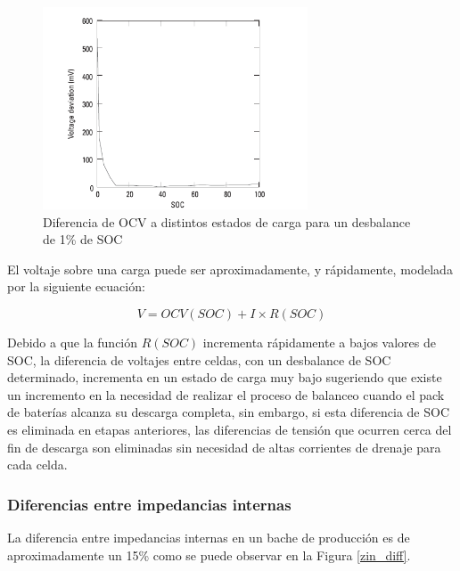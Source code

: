 \documentclass[10pt,a4paper]{article}
\begin{document}
	\begin{figure}[h!]
		\begin{center}
			\includegraphics[width=0.7\textwidth]{diff_imbalance.png}
			\caption{Diferencia de OCV a distintos estados de carga para un desbalance de 1\% de SOC}
			\label{diff_imbalance}
		\end{center}
	\end{figure}
	
	
	
	\noindent El voltaje sobre una carga puede ser aproximadamente, y rápidamente, modelada por la siguiente ecuación:
	
	\begin{equation}
		V = OCV(SOC) + I \times R(SOC)
		\label{v_load_bat}
	\end{equation}
	
	\noindent Debido a que la función $R(SOC)$ incrementa rápidamente a bajos valores de SOC, la diferencia de voltajes entre celdas, con un desbalance de SOC determinado, incrementa en un estado de carga muy bajo sugeriendo que existe un incremento en la necesidad de realizar el proceso de balanceo cuando el pack de baterías alcanza su descarga completa, sin embargo, si esta diferencia de SOC es eliminada en etapas anteriores, las diferencias de tensión que ocurren cerca del fin de descarga son eliminadas sin necesidad de altas corrientes de drenaje para cada celda.\\
	
	\clearpage
	\subsubsection{Diferencias entre impedancias internas}
	
	La diferencia entre impedancias internas en un bache de producción es de aproximadamente un 15\% como se puede observar en la Figura \ref{zin_diff}.\\
	
\end{document}
